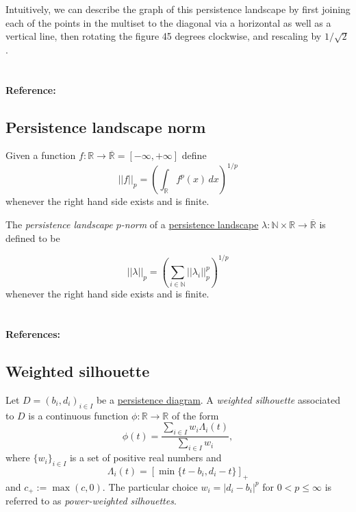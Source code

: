 \documentclass{amsart}
\begin{document}
	Intuitively, we can describe the graph of this persistence landscape by first joining each of the points in the multiset to the diagonal via a horizontal as well as a vertical line, then rotating the figure 45 degrees clockwise, and rescaling by $1/\sqrt{2}$.
	
	\paragraph{\\ Reference:} \cite{bubenik2015statistical}
	
	\subsection*{Persistence landscape norm} \label{persistence landscape norm}
	
	Given a function $f : \mathbb R \to \overline{\mathbb R} = [-\infty, +\infty]$ define
	\begin{equation*}
	||f||_p = \left( \int_{\mathbb R} f^p(x)\, dx \right)^{1/p}
	\end{equation*}
	whenever the right hand side exists and is finite.
	
	The \textit{persistence landscape $p$-norm} of a \hyperref[persistence landscape]{persistence landscape} $\lambda : \mathbb N \times \mathbb R \to \overline{\mathbb R}$ is defined to be
	
	\begin{equation*}
	||\lambda||_p = \left( \sum_{i \in \mathbb N} ||\lambda_i||^p_p \right)^{1/p}
	\end{equation*}
	whenever the right hand side exists and is finite.

	\paragraph{\\ References:} \cite{stein2011functional, bubenik2015statistical}
	
	\subsection*{Weighted silhouette} \label{weighted silhouettes}
	
	Let $D = {(b_i, d_i)}_{i \in I}$ be a \hyperref[persistence diagram] {persistence diagram}. A \textit{weighted silhouette} associated to $D$ is a continuous function $\phi : \mathbb R \to \mathbb R$ of the form
	\begin{equation*}
	\phi(t) = \frac{\sum_{i \in I}w_i \Lambda_i(t)}{\sum_{i \in I}w_i},
	\end{equation*}
	where $\{w_i\}_{i \in I}$ is a set of positive real numbers and
	\begin{equation*} \label{equation: lambda for persistence landscapes}
	\Lambda_i(t) = \left[ \min \{t-b_i, d_i-t\}\right]_+
	\end{equation*}
	and $c_+ := \max(c,0)$. The particular choice $w_i = \vert d_i - b_i \vert^p$ for $0 < p \leq \infty$ is referred to as \textit{power-weighted silhouettes}.
	
\end{document}
